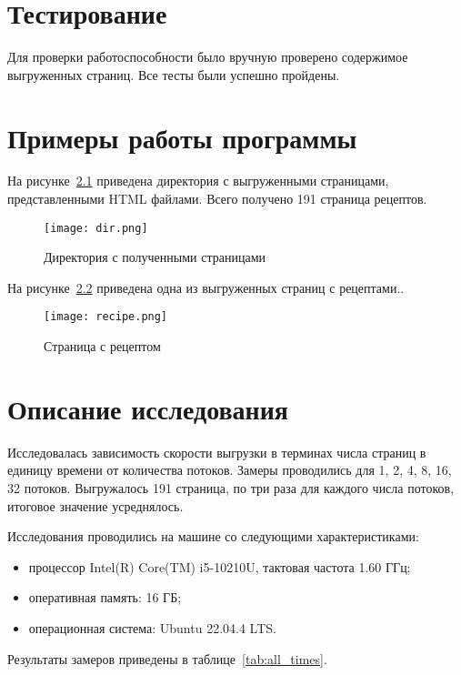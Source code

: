 \clearpage

\chapter{Тестирование}

Для проверки работоспособности было вручную проверено содержимое выгруженных страниц. Все тесты были успешно пройдены.
\clearpage

\chapter{Примеры работы программы}

На рисунке~\ref{fig:dir} приведена директория с выгруженными страницами, представленными HTML файлами. Всего получено 191 страница рецептов.
\begin{figure}[H]
	\centering
	\texttt{[image: dir.png]}
	\caption{Директория с полученными страницами}
	\label{fig:dir}
\end{figure}

На рисунке~\ref{fig:recipe} приведена одна из выгруженных страниц с рецептами..
\begin{figure}[H]
	\centering
	\texttt{[image: recipe.png]}
	\caption{Страница с рецептом}
	\label{fig:recipe}
\end{figure}
\clearpage


\chapter{Описание исследования}

Исследовалась зависимость скорости выгрузки в терминах числа страниц в единицу времени от количества потоков. Замеры проводились для 1, 2, 4, 8, 16, 32 потоков. Выгружалось 191 страница, по три раза для каждого числа потоков, итоговое значение усреднялось.

Исследования проводились на машине со следующими характеристиками:
\begin{itemize}[label=---]
	\item процессор Intel(R) Core(TM) i5-10210U, тактовая частота 1.60 ГГц;
	\item оперативная память: 16 ГБ;
	\item операционная система: Ubuntu 22.04.4 LTS.
\end{itemize}

Результаты замеров приведены в таблице~\ref{tab:all_times}.


